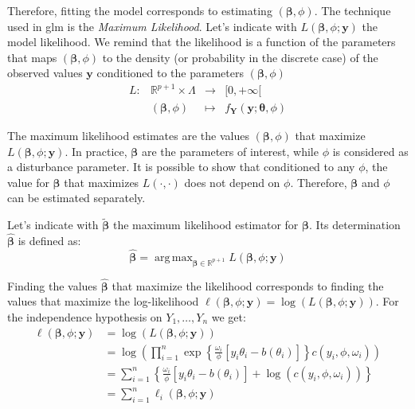 \documentclass[a4paper, twoside, openright, 12pt]{report}
\DeclareMathOperator*{\argmax}{arg\,max}  %
\theoremstyle{definition}
\theoremstyle{definition}
\theoremstyle{definition}
\theoremstyle{remark}
\begin{document}
Therefore, fitting the model corresponds to estimating \(\left(\boldsymbol{\beta}, \phi\right)\). The technique used in \ac{glm} is the \emph{Maximum Likelihood}. Let's indicate with \(L\left(\boldsymbol{\beta}, \phi; \boldsymbol{y}\right)\) the model likelihood. We remind that the likelihood is a function of the parameters that maps \(\left(\boldsymbol{\beta}, \phi\right)\) to the density (or probability in the discrete case) of the observed values \(\boldsymbol{y}\) conditioned to the parameters \(\left(\boldsymbol{\beta}, \phi\right)\)
\[
\begin{array}{cccc}
L: & \mathbb{R}^{p+1} \times \Lambda & \longrightarrow & [0, +\infty[ \\
   & \left(\boldsymbol{\beta}, \phi\right) & \longmapsto & f_{\boldsymbol{Y}}(\boldsymbol{y}; \boldsymbol{\theta}, \phi)
\end{array}
\]

The maximum likelihood estimates are the values \(\left(\boldsymbol{\beta}, \phi\right)\) that maximize \(L\left(\boldsymbol{\beta}, \phi; \boldsymbol{y}\right)\). In practice, \(\boldsymbol{\beta}\) are the parameters of interest, while \(\phi\) is considered as a disturbance parameter. It is possible to show that conditioned to any \(\phi\), the value for \(\boldsymbol{\beta}\) that maximizes \(L(\cdot, \cdot)\) does not depend on \(\phi\). Therefore, \(\boldsymbol{\beta}\) and \(\phi\) can be estimated separately.

Let's indicate with \(\tilde{\boldsymbol{\beta}}\) the maximum likelihood estimator for \(\boldsymbol{\beta}\). Its determination \(\hat{\boldsymbol{\beta}}\) is defined as:
\begin{equation}
\label{eq:max-lik-est}
\hat{\boldsymbol{\beta}} = \argmax_{\boldsymbol{\beta}\in\mathbb{R}^{p+1}}{L\left(\boldsymbol{\beta}, \phi; \boldsymbol{y}\right)}
\end{equation}

Finding the values \(\hat{\boldsymbol{\beta}}\) that maximize the likelihood corresponds to finding the values that maximize the log-likelihood \(\ell\left(\boldsymbol{\beta}, \phi; \boldsymbol{y}\right) = \log{\left(L\left(\boldsymbol{\beta}, \phi; \boldsymbol{y}\right)\right)}\). For the independence hypothesis on \(Y_1, \dots, Y_n\) we get:
\begin{align}
\nonumber
\ell\left(\boldsymbol{\beta}, \phi; \boldsymbol{y}\right) & =
\log{\left(L\left(\boldsymbol{\beta}, \phi; \boldsymbol{y}\right)\right)}
\\ \nonumber & =
\log{\left(\prod_{i=1}^{n}{\exp{\left\{ \frac{\omega_i}{\phi} \left[y_i\theta_i - b(\theta_i) \right] \right\}} c(y_i, \phi, \omega_i)}\right)}
\\ \label{eq:log-like} & =
\sum_{i=1}^{n}{
\left\{
\frac{\omega_i}{\phi} \left[y_i\theta_i - b(\theta_i) \right] + \log{\left(c(y_i, \phi, \omega_i)\right)}
\right\}
}
\\ \nonumber & =
\sum_{i=1}^{n}{\ell_i\left(\boldsymbol{\beta}, \phi; \boldsymbol{y}\right)}
\end{align}
\end{document}
